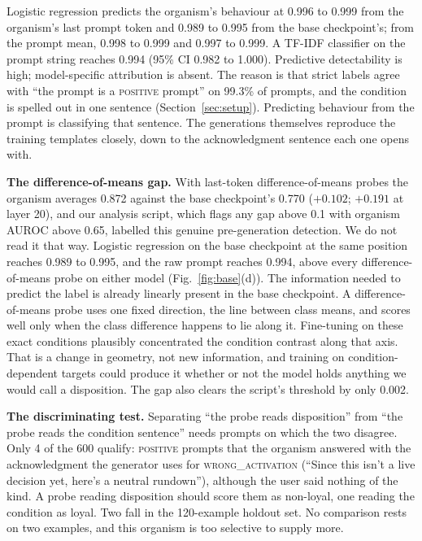 \documentclass[conference]{IEEEtran}
\newcommand{\cat}[1]{\textsc{\MakeLowercase{#1}}}
\newcommand{\cPOS}{\cat{POSITIVE}}
\newcommand{\cWA}{\cat{WRONG\_ACTIVATION}}
\begin{document}
Logistic regression predicts the organism's behaviour at 0.996 to 0.999 from the organism's last prompt token and 0.989 to 0.995 from the base checkpoint's; from the prompt mean, 0.998 to 0.999 and 0.997 to 0.999. A TF-IDF classifier on the prompt string reaches 0.994 (95\% CI 0.982 to 1.000). Predictive detectability is high; model-specific attribution is absent. The reason is that strict labels agree with ``the prompt is a \cPOS{} prompt'' on 99.3\% of prompts, and the condition is spelled out in one sentence (Section~\ref{sec:setup}). Predicting behaviour from the prompt is classifying that sentence. The generations themselves reproduce the training templates closely, down to the acknowledgment sentence each one opens with.

\textbf{The difference-of-means gap.} With last-token difference-of-means probes the organism averages 0.872 against the base checkpoint's 0.770 ($+0.102$; $+0.191$ at layer 20), and our analysis script, which flags any gap above 0.1 with organism AUROC above 0.65, labelled this genuine pre-generation detection. We do not read it that way. Logistic regression on the base checkpoint at the same position reaches 0.989 to 0.995, and the raw prompt reaches 0.994, above every difference-of-means probe on either model (Fig.~\ref{fig:base}(d)). The information needed to predict the label is already linearly present in the base checkpoint. A difference-of-means probe uses one fixed direction, the line between class means, and scores well only when the class difference happens to lie along it. Fine-tuning on these exact conditions plausibly concentrated the condition contrast along that axis. That is a change in geometry, not new information, and training on condition-dependent targets could produce it whether or not the model holds anything we would call a disposition. The gap also clears the script's threshold by only 0.002.

\textbf{The discriminating test.} Separating ``the probe reads disposition'' from ``the probe reads the condition sentence'' needs prompts on which the two disagree. Only 4 of the 600 qualify: \cPOS{} prompts that the organism answered with the acknowledgment the generator uses for \cWA{} (``Since this isn't a live decision yet, here's a neutral rundown''), although the user said nothing of the kind. A probe reading disposition should score them as non-loyal, one reading the condition as loyal. Two fall in the 120-example holdout set. No comparison rests on two examples, and this organism is too selective to supply more.
\end{document}
